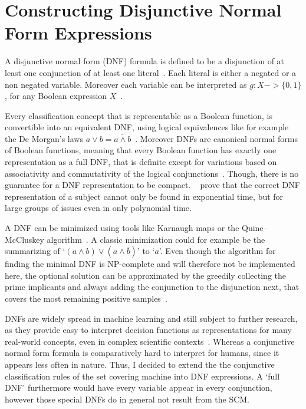 \chapter{Constructing Disjunctive Normal Form Expressions}\label{ch:dnf}

A disjunctive normal form (DNF) formula is defined to be a disjunction of at least one conjunction of at least one literal~\citep{aizenstein}.
Each literal is either a negated or a non negated variable. 
Moreover each variable can be interpreted as \(g: X -> \lbrace0,1\rbrace\), for any Boolean expression \(X\)~\citep{davey}.

Every classification concept that is representable as a Boolean function, is convertible into an equivalent DNF,
using logical equivalences like for example the De Morgan's laws \(a \vee b = \overline{a \wedge b}\)~\citep{davey}.
Moreover DNFs are canonical normal forms of Boolean functions, meaning that every Boolean function has exactly one representation as a full DNF,
that is definite except for variations based on associativity and commutativity of the logical conjunctions~\citep{davey}.
Though, there is no guarantee for a DNF representation to be compact.
~\cite{aizenstein} prove that the correct DNF representation of a subject cannot only be found in exponential time,
but for large groups of issues even in only polynomial time.

A DNF can be minimized using tools like Karnaugh maps or the Quine–McCluskey algorithm~\citep{allender}.
A classic minimization could for example be the summarizing of `\((a \wedge b)\vee(a \wedge \overline{b})\)' to `\(a\)'.
Even though the algorithm for finding the minimal DNF is NP-complete and will therefore not be implemented here,
the optional solution can be approximated by the greedily collecting the prime implicants and
always adding the conjunction to the disjunction next, that covers the most remaining positive samples~\citep{allender}.

DNFs are widely spread in machine learning and still subject to further research,
as they provide easy to interpret decision functions as representations for many real-world concepts, even in complex scientific contexts~\citep{aizenstein}.
Whereas a conjunctive normal form formula is comparatively hard to interpret for humans, since it appears less often in nature.
Thus, I decided to extend the the conjunctive classification rules of the set covering machine into DNF expressions.
A `full DNF' furthermore would have every variable appear in every conjunction, however those special DNFs do in general not result from the SCM.\

